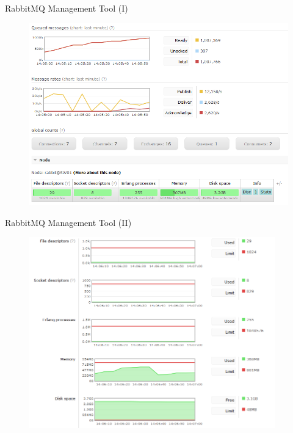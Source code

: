 \documentclass[10pt]{beamer}
\begin{document}

\begin{frame}{RabbitMQ Management Tool (I)}
	\begin{figure}
		\vspace{-0.5cm}
		\centering
		\includegraphics[width=\textwidth]{pic/rmqoverview}
	\end{figure}
\end{frame}

\begin{frame}{RabbitMQ Management Tool (II)}
	\begin{figure}
		\vspace{-0.7cm}
		\centering
		\includegraphics[width=0.95\textwidth]{pic/rmqoverview2}
	\end{figure}
\end{frame}
\end{document}
